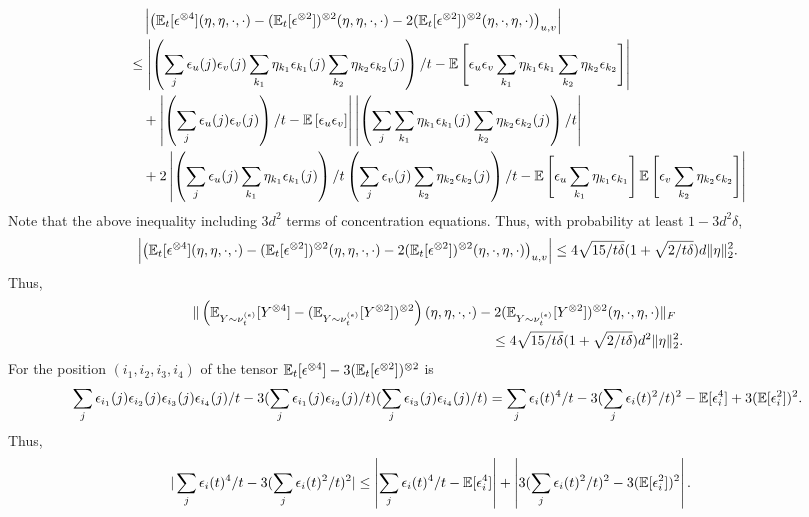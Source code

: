 \begin{align*}
& \quad \left|\left(\mathbb{E}_t[\epsilon^{\otimes4}](\eta,\eta,\cdot,\cdot) - (\mathbb{E}_t[\epsilon^{\otimes2}])^{\otimes 2}(\eta,\eta,\cdot,\cdot) - 2(\mathbb{E}_t[\epsilon^{\otimes2}])^{\otimes 2}(\eta,\cdot,\eta,\cdot) \right)_{u,v}\right|\\
& \le \left| \left(\sum_j \epsilon_u(j)\epsilon_v(j)\sum_{k_1}\eta_{k_1}\epsilon_{k_1}(j)\sum_{k_2}\eta_{k_2}\epsilon_{k_2}(j)\right)/t- \mathbb{E}\left[ \epsilon_{u}\epsilon_{v}\sum_{k_1}\eta_{k_1}\epsilon_{k_1}\sum_{k_2}\eta_{k_2}\epsilon_{k_2}\right]\right| \\ 
& \quad + \left| \left(\sum_j \epsilon_u(j)\epsilon_v(j)\right)/t -  \mathbb{E}\left[ \epsilon_{u}\epsilon_{v}\right]\right|\left|\left(\sum_j\sum_{k_1}\eta_{k_1}\epsilon_{k_1}(j)\sum_{k_2}\eta_{k_2}\epsilon_{k_2}(j)\right)/t \right| \\
& \quad + 2\left| \left(\sum_j \epsilon_u(j)\sum_{k_1}\eta_{k_1}\epsilon_{k_1}(j)\right)/t\left(\sum_j \epsilon_v(j)\sum_{k_2}\eta_{k_2}\epsilon_{k_2}(j)\right)/t- \mathbb{E}\left[ \epsilon_{u}\sum_{k_1}\eta_{k_1}\epsilon_{k_1}\right]\mathbb{E}\left[\epsilon_{v}\sum_{k_2}\eta_{k_2}\epsilon_{k_2}\right]\right| 
\end{align*}
Note that the above inequality including $3d^2$ terms of concentration equations. Thus, with probability at least $1-3d^2\delta$,
\[
\left|\left(\mathbb{E}_t[\epsilon^{\otimes4}](\eta,\eta,\cdot,\cdot) - (\mathbb{E}_t[\epsilon^{\otimes2}])^{\otimes 2}(\eta,\eta,\cdot,\cdot) - 2(\mathbb{E}_t[\epsilon^{\otimes2}])^{\otimes 2}(\eta,\cdot,\eta,\cdot) \right)_{u,v}\right| 
\le
4\sqrt{15/t\delta}(1+\sqrt{2/t\delta})d\|\eta\|^2_2.  
\]
Thus, 
\begin{align*}
 \| \left(\mathbb{E}_{Y\sim \nu_t^{(\epsilon)}} [Y^{\otimes4}] - (\mathbb{E}_{Y\sim \nu_t^{(\epsilon)}} [Y^{\otimes2}])^{\otimes 2}\right)(\eta,\eta,\cdot,\cdot) &  - 2 (\mathbb{E}_{Y\sim \nu_t^{(\epsilon)}} [Y^{\otimes2}])^{\otimes 2}(\eta,\cdot,\eta,\cdot)\|_F \\
& \quad \le 4\sqrt{15/t\delta}(1+\sqrt{2/t\delta})d^2\|\eta\|^2_2.
\end{align*}
For the position $(i_1,i_2,i_3,i_4)$ of the tensor $\mathbb{E}_t[\epsilon^{\otimes4}] - 3(\mathbb{E}_t[\epsilon^{\otimes2}])^{\otimes 2}$ is
\[
\sum_j \epsilon_{i_1}(j)\epsilon_{i_2}(j)\epsilon_{i_3}(j)\epsilon_{i_4}(j)/t - 3(\sum_j \epsilon_{i_1}(j)\epsilon_{i_2}(j)/t)(\sum_j \epsilon_{i_3}(j)\epsilon_{i_4}(j)/t) = \sum_j \epsilon_i(t)^4/t - 3(\sum_j \epsilon_i(t)^2/t)^2  - \mathbb{E}[\epsilon_i^4] + 3(\mathbb{E}[\epsilon_i^2])^2.
\]  
Thus, 
\begin{align*}
|\sum_j \epsilon_i(t)^4/t - 3(\sum_j \epsilon_i(t)^2/t)^2| & \le \left|\sum_j \epsilon_i(t)^4/t - \mathbb{E}[\epsilon_i^4]\right| + \left|3(\sum_j \epsilon_i(t)^2/t)^2 - 3(\mathbb{E}[\epsilon_i^2])^2\right|. 
\end{align*}
